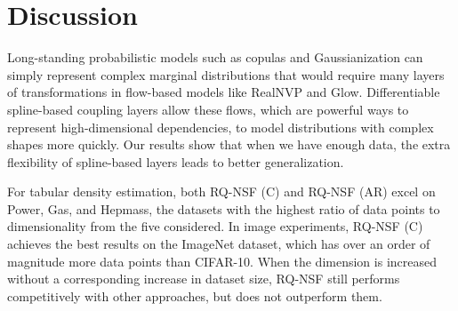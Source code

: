 \vspace*{-0.05in}
\section{Discussion}
\vspace*{-0.05in}

Long-standing probabilistic models such as copulas \citep{elidan:2013:copulas} and Gaussianization \citep{chen:2000:gaussianization}
can simply represent complex marginal distributions that would require many layers of
transformations in flow-based models like RealNVP and Glow.
Differentiable spline-based coupling layers allow these flows, which are
powerful ways to represent high-dimensional dependencies, to model distributions
with complex shapes more quickly. Our results show that when we have enough
data, the extra flexibility of spline-based layers leads to better
generalization.

For tabular density estimation, both RQ-NSF (C) and RQ-NSF (AR) excel on Power, Gas, and Hepmass, the datasets with the highest ratio of data points to dimensionality from the five considered. 
In image experiments, RQ-NSF (C) achieves the best results on the ImageNet dataset, which has over an order of magnitude more data points than CIFAR-10.
When the dimension is increased without a corresponding increase in dataset size, RQ-NSF still performs competitively with other approaches, but does not outperform them.

